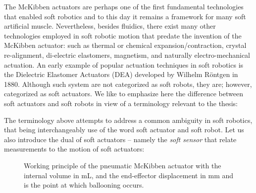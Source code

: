 The McKibben actuators are perhaps one of the first fundamental technologies that enabled soft robotics and to this day it remains a framework for many soft artificial muscle. Nevertheless, besides fluidics, there exist many other technologies employed in soft robotic motion that predate the invention of the McKibben actuator: such as thermal or chemical expansion/contraction, crystal re-alignment, di-electric elastomers, magnetism, and naturally electro-mechanical actuation. An early example of popular actuation techniques in soft robotics is the Dielectric Elastomer Actuators (DEA) developed by Wilhelm R\"{o}ntgen in 1880. Although such system are not categorized as soft robots, they are; however, categorized as soft actuators. We like to emphasize here the difference between soft actuators and soft robots in view of a terminology relevant to the thesis:

%
%
\noindent The terminology above attempts to address a common ambiguity in soft robotics, that being interchangeably use of the word soft actuator and soft robot. Let us also introduce the dual of soft actuators -- namely the \emph{soft sensor} that relate measurements to the motion of soft actuators:
%
\begin{figure}[!t]
  \ifx\printFigures\undefined
  \else
  \centering
  
  \fi
  \vspace{-3mm}
  \caption{Working principle of the pneumatic McKibben actuator with the internal volume  in \si{\milli \liter}, and the end-effector displacement  in \si{\milli \meter} and  is the point at which ballooning occurs.
  \label{fig:C0:mckibben}}
\end{figure}
%


